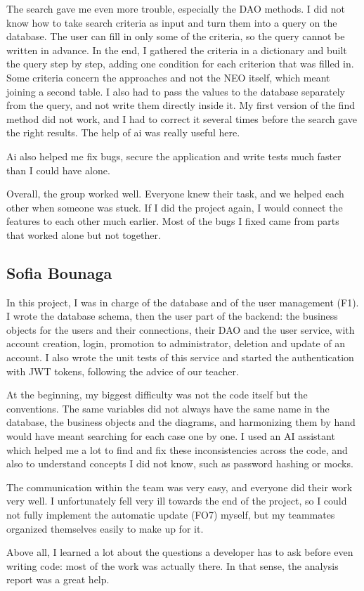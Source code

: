 The search gave me even more trouble, especially the DAO methods. I did not know how to take
search criteria as input and turn them into a query on the database. The user can fill in only
some of the criteria, so the query cannot be written in advance. In the end, I gathered the
criteria in a dictionary and built the query step by step, adding one condition for each criterion
that was filled in. Some criteria concern the approaches and not the NEO itself, which meant
joining a second table. I also had to pass the values to the database separately from the query,
and not write them directly inside it. My first version of the find method did not work, and I
had to correct it several times before the search gave the right results. The help of ai was really useful here.


Ai also helped me fix bugs, secure the application and write tests much faster than I could have alone.


Overall, the group worked well. Everyone knew their task, and we helped each other when someone
was stuck. If I did the project again, I would connect the features to each other much earlier.
Most of the bugs I fixed came from parts that worked alone but not together.


\subsection{Sofia Bounaga}

In this project, I was in charge of the database and of the user management (F1). I wrote the
database schema, then the user part of the backend: the business objects for the users and their
connections, their DAO and the user service, with account creation, login, promotion to
administrator, deletion and update of an account. I also wrote the unit tests of this service and
started the authentication with JWT tokens, following the advice of our teacher.

At the beginning, my biggest difficulty was not the code itself but the conventions. The same
variables did not always have the same name in the database, the business objects and the
diagrams, and harmonizing them by hand would have meant searching for each case one by one. I used
an AI assistant which helped me a lot to find and fix these inconsistencies across
the code, and also to understand concepts I did not know, such as password hashing or mocks.

The communication within the team was very easy, and everyone did their work very well. I
unfortunately fell very ill towards the end of the project, so I could not fully implement the
automatic update (FO7) myself, but my teammates organized themselves easily to make up for it.

Above all, I learned a lot about the questions a developer has to ask before even writing code:
most of the work was actually there. In that sense, the analysis report was a great help.

